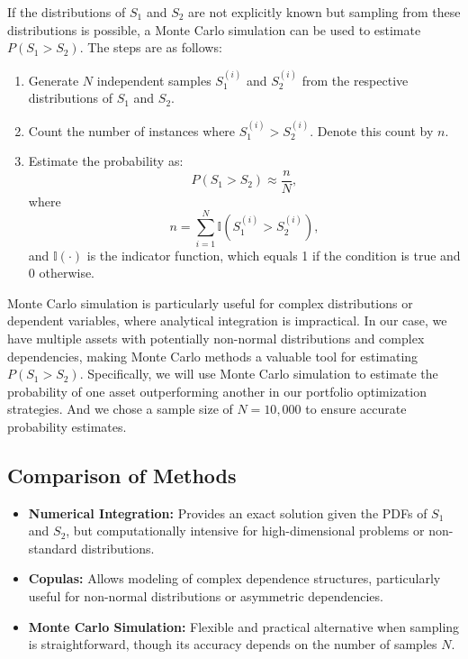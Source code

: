 If the distributions of $S_1$ and $S_2$ are not explicitly known but sampling from these distributions is possible, a Monte Carlo simulation can be used to estimate $P(S_1 > S_2)$. The steps are as follows:
\begin{enumerate}
    \item Generate $N$ independent samples $S_1^{(i)}$ and $S_2^{(i)}$ from the respective distributions of $S_1$ and $S_2$.
    \item Count the number of instances where $S_1^{(i)} > S_2^{(i)}$. Denote this count by $n$.
    \item Estimate the probability as:
    \begin{equation}
    P(S_1 > S_2) \approx \frac{n}{N},
    \end{equation}
    where
    \begin{equation}
    n = \sum_{i=1}^N \mathbb{I}(S_1^{(i)} > S_2^{(i)}),
    \end{equation}
    and $\mathbb{I}(\cdot)$ is the indicator function, which equals 1 if the condition is true and 0 otherwise.
\end{enumerate}

Monte Carlo simulation is particularly useful for complex distributions or dependent variables, where analytical integration is impractical. In our case, we have multiple assets with potentially non-normal distributions and complex dependencies, making Monte Carlo methods a valuable tool for estimating $P(S_1 > S_2)$.
Specifically, we will use Monte Carlo simulation to estimate the probability of one asset outperforming another in our portfolio optimization strategies. And we chose a sample size of $N = 10,000$ to ensure accurate probability estimates.

\subsection{Comparison of Methods}

\begin{itemize}
    \item \textbf{Numerical Integration:} Provides an exact solution given the PDFs of $S_1$ and $S_2$, but computationally intensive for high-dimensional problems or non-standard distributions.
    \item \textbf{Copulas:} Allows modeling of complex dependence structures, particularly useful for non-normal distributions or asymmetric dependencies.
    \item \textbf{Monte Carlo Simulation:} Flexible and practical alternative when sampling is straightforward, though its accuracy depends on the number of samples $N$.
\end{itemize}

